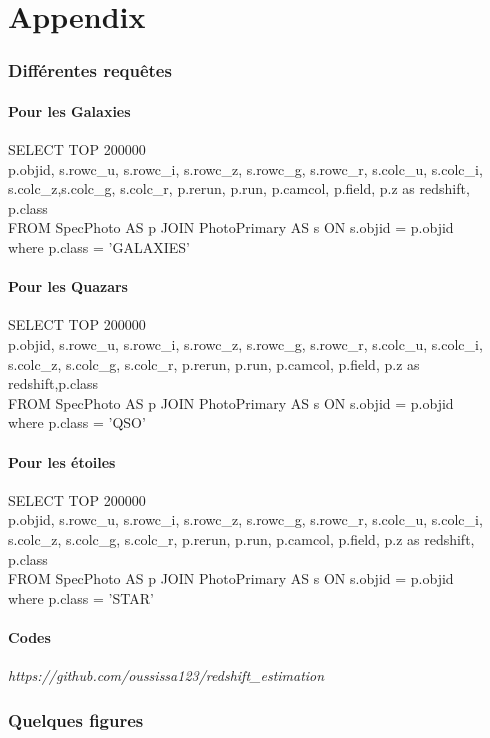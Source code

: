 \chapter*{Appendix}
\subsection*{Différentes requêtes}
\subsubsection*{Pour les Galaxies}
\noindent SELECT TOP 200000\\
p.objid, s.rowc\_u, s.rowc\_i, s.rowc\_z, s.rowc\_g, s.rowc\_r, s.colc\_u, s.colc\_i, s.colc\_z,s.colc\_g, s.colc\_r, p.rerun, p.run, p.camcol, p.field, p.z as redshift, p.class \\
FROM SpecPhoto AS p JOIN PhotoPrimary AS s ON s.objid = p.objid\\
where p.class = 'GALAXIES'
\subsubsection*{Pour les Quazars}
\noindent SELECT TOP 200000\\
p.objid, s.rowc\_u, s.rowc\_i, s.rowc\_z, s.rowc\_g, s.rowc\_r, s.colc\_u, s.colc\_i, s.colc\_z, s.colc\_g, s.colc\_r, p.rerun, p.run, p.camcol, p.field, p.z as redshift,p.class \\
FROM SpecPhoto AS p JOIN PhotoPrimary AS s ON s.objid = p.objid\\
where p.class = 'QSO'
\subsubsection*{Pour les étoiles}
\noindent SELECT TOP 200000\\
p.objid, s.rowc\_u, s.rowc\_i, s.rowc\_z, s.rowc\_g, s.rowc\_r, s.colc\_u, s.colc\_i, s.colc\_z, s.colc\_g, s.colc\_r, p.rerun, p.run, p.camcol, p.field, p.z as redshift, p.class\\
FROM SpecPhoto AS p JOIN PhotoPrimary AS s ON s.objid = p.objid\\
where p.class = 'STAR'
\subsubsection*{Codes}
\textit{https://github.com/oussissa123/redshift\_estimation}
\subsection*{Quelques figures}

